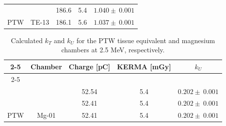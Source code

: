 \begin{table}[!h]
\begin{tabular}{ccccc}
\multicolumn{1}{|c|}{\cellcolor[HTML]{FEEFD1}}                      &                                 & 186.6                                  & 5.4                                     & \multicolumn{1}{c|}{$1.040 \pm \:0.001$}                      \\
\multicolumn{1}{|c|}{\multirow{-7}{*}{\cellcolor[HTML]{FEEFD1}PTW}} & \multirow{-3}{*}{TE-13}         & 186.1                                  & 5.6                                     & \multicolumn{1}{c|}{$1.037 \pm \:0.001$}                      \\ \hline
\end{tabular}

\end{table}
\begin{table}[!h]
\centering
\begin{tabular}{ccccc}
\cline{2-5}
\multicolumn{1}{c|}{}                                               & \cellcolor[HTML]{D9D9D9}Chamber & \cellcolor[HTML]{D9D9D9}Charge {[}\unit{\pico\coulomb}{]} & \cellcolor[HTML]{D9D9D9}KERMA {[}\unit{\milli\gray}{]} & \multicolumn{1}{c|}{\cellcolor[HTML]{D9D9D9}$k_U$} \\ \cline{2-5} 
                                                                    &                                 &                                         &                                         &                                                 \\ \hline
\multicolumn{1}{|c|}{\cellcolor[HTML]{FEEFD1}}                      &                                 & 52.54                                   & 5.4                                     & \multicolumn{1}{c|}{$0.202 \pm \:0.001$}                      \\
\multicolumn{1}{|c|}{\cellcolor[HTML]{FEEFD1}}                      &                                 & 52.41                                   & 5.4                                     & \multicolumn{1}{c|}{$0.202 \pm \:0.001$}                      \\
\multicolumn{1}{|c|}{\multirow{-3}{*}{\cellcolor[HTML]{FEEFD1}PTW}} & \multirow{-3}{*}{Mg-01}         & 52.41                                   & 5.4                                     & \multicolumn{1}{c|}{$0.202 \pm \:0.001$}                      \\ \hline
\end{tabular}
\caption{Calculated $k_T$ and $k_U$ for the PTW tissue equivalent and magnesium chambers at 2.5 \unit{\mega\electronvolt}, respectively.}
\end{table}

